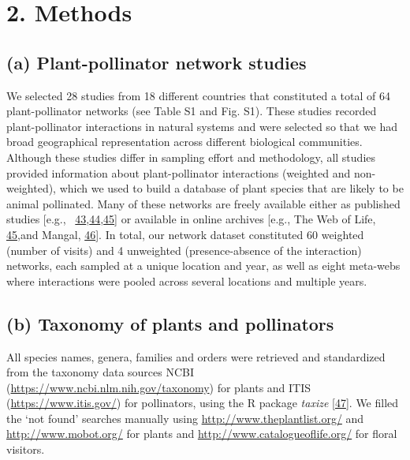 \documentclass[
  12pt,
  a4paper,
]{article}
\begin{document}
\hypertarget{methods}{%
\section{2. Methods}\label{methods}}

\hypertarget{a-plant-pollinator-network-studies}{%
\subsection{(a) Plant-pollinator network studies}\label{a-plant-pollinator-network-studies}}

We selected 28 studies from 18 different countries that constituted a total of 64 plant-pollinator networks (see Table S1 and Fig. S1). These studies recorded plant-pollinator interactions in natural systems and were selected so that we had broad geographical representation across different biological communities. Although these studies differ in sampling effort and methodology, all studies provided information about plant-pollinator interactions (weighted and non-weighted), which we used to build a database of plant species that are likely to be animal pollinated. Many of these networks are freely available either as published studies {[}e.g.,~ \protect\hyperlink{ref-carvalheiro2014}{43},\protect\hyperlink{ref-olesen2007}{44},\protect\hyperlink{ref-fortuna2010}{45}{]} or available in online archives {[}e.g., The Web of Life, \protect\hyperlink{ref-fortuna2010}{45},and Mangal, \protect\hyperlink{ref-poisot2016}{46}{]}. In total, our network dataset constituted 60 weighted (number of visits) and 4 unweighted (presence-absence of the interaction) networks, each sampled at a unique location and year, as well as eight meta-webs where interactions were pooled across several locations and multiple years.

\hypertarget{b-taxonomy-of-plants-and-pollinators}{%
\subsection{(b) Taxonomy of plants and pollinators}\label{b-taxonomy-of-plants-and-pollinators}}

All species names, genera, families and orders were retrieved and standardized from the taxonomy data sources NCBI (\url{https://www.ncbi.nlm.nih.gov/taxonomy}) for plants and ITIS (\url{https://www.itis.gov/}) for pollinators, using the R package \emph{taxize} {[}\protect\hyperlink{ref-chamberlain2020}{47}{]}. We filled the `not found' searches manually using \url{http://www.theplantlist.org/} and \url{http://www.mobot.org/} for plants and \url{http://www.catalogueoflife.org/} for floral visitors.
\end{document}
